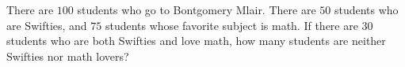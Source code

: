 There are $100$ students who go to Bontgomery Mlair. There are $50$ students who are Swifties, and $75$ students whose favorite subject is math. If there are $30$ students who are both Swifties and love math, how many students are neither Swifties nor math lovers?
